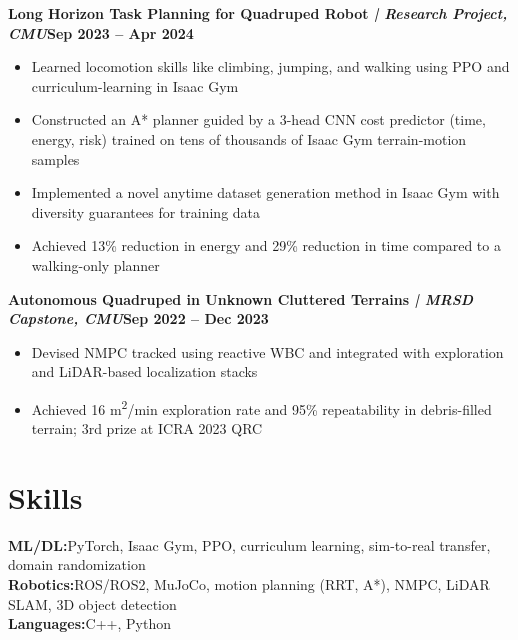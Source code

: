 \documentclass[letterpaper,10pt]{article}
\newcommand{\entry}[4]{%
  \vspace{3pt}%
  \noindent\textbf{#1}\hfill\textbf{#2}%
  \ifx\relax#3\relax\else\\%
    \noindent\textit{\small #3}\hfill\textit{\small #4}%
  \fi%
  \vspace{1pt}%
}
\newcommand{\resumeItemListStart}{\begin{itemize}[leftmargin=14pt, label=\textbullet, nosep, topsep=2pt, parsep=1pt]}
\newcommand{\resumeItemListEnd}{\end{itemize}}
\newcommand{\resumeItem}[1]{\item\small{#1}}
\begin{document}
\entry{Long Horizon Task Planning for Quadruped Robot {\normalfont\textit{| Research Project, CMU}}}{Sep 2023 -- Apr 2024}{}{}
\resumeItemListStart
  \resumeItem{Learned locomotion skills like climbing, jumping, and walking using PPO and curriculum-learning in Isaac Gym}
  \resumeItem{Constructed an A* planner guided by a 3-head CNN cost predictor (time, energy, risk) trained on tens of thousands of Isaac Gym terrain-motion samples}
  \resumeItem{Implemented a novel anytime dataset generation method in Isaac Gym with diversity guarantees for training data}
  \resumeItem{Achieved 13\% reduction in energy and 29\% reduction in time compared to a walking-only planner}
\resumeItemListEnd

\entry{Autonomous Quadruped in Unknown Cluttered Terrains {\normalfont\textit{| MRSD Capstone, CMU}}}{Sep 2022 -- Dec 2023}{}{}
\resumeItemListStart
  \resumeItem{Devised NMPC tracked using reactive WBC and integrated with exploration and LiDAR-based localization stacks}
  \resumeItem{Achieved 16 m\textsuperscript{2}/min exploration rate and 95\% repeatability in debris-filled terrain; 3rd prize at ICRA 2023 QRC}
\resumeItemListEnd


\section{Skills}

\vspace{2pt}
\noindent\small
\textbf{ML/DL:}\enspace PyTorch, Isaac Gym, PPO, curriculum learning, sim-to-real transfer, domain randomization \\[3pt]
\textbf{Robotics:}\enspace ROS/ROS2, MuJoCo, motion planning (RRT, A*), NMPC, LiDAR SLAM, 3D object detection \\[3pt]
\textbf{Languages:}\enspace C{++}, Python
\end{document}
